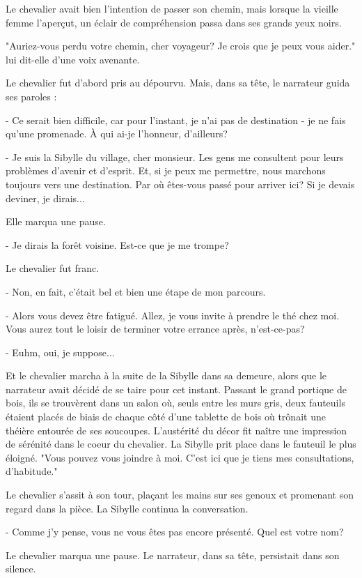 \documentclass[a4paper,11pt, openany]{book}
\begin{document}
Le chevalier avait bien l'intention de passer son chemin, mais lorsque la vieille femme l'aperçut, un éclair de compréhension passa dans ses grands yeux noirs.

"Auriez-vous perdu votre chemin, cher voyageur? Je crois que je peux vous aider." lui dit-elle d'une voix avenante.

Le chevalier fut d'abord pris au dépourvu. Mais, dans sa tête, le narrateur guida ses paroles : 

- Ce serait bien difficile, car pour l'instant, je n'ai pas de destination - je ne fais qu'une promenade. À qui ai-je l'honneur, d'ailleurs?

- Je suis la Sibylle du village, cher monsieur. Les gens me consultent pour leurs problèmes d'avenir et d'esprit. 
Et, si je peux me permettre, nous marchons toujours vers une destination. Par où êtes-vous passé pour arriver ici? Si je devais deviner, je dirais...

Elle marqua une pause.

- Je dirais la forêt voisine. Est-ce que je me trompe?

Le chevalier fut franc.

- Non, en fait, c'était bel et bien une étape de mon parcours.

- Alors vous devez être fatigué. Allez, je vous invite à prendre le thé chez moi. Vous aurez tout le loisir de terminer votre errance après, n'est-ce-pas?

- Euhm, oui, je suppose...

Et le chevalier marcha à la suite de la Sibylle dans sa demeure, alors que le narrateur avait décidé de se taire pour cet instant. 
Passant le grand portique de bois, ils se trouvèrent dans un salon où, seuls entre les murs gris, 
deux fauteuils étaient placés de biais de chaque côté d'une tablette de bois où trônait une théière entourée de ses soucoupes. 
L'austérité du décor fit naître une impression de sérénité dans le coeur du chevalier.
La Sibylle prit place dans le fauteuil le plus éloigné.
"Vous pouvez vous joindre à moi. C'est ici que je tiens mes consultations, d'habitude."

Le chevalier s'assit à son tour, plaçant les mains sur ses genoux et promenant son regard dans la pièce. La Sibylle continua la conversation.

- Comme j'y pense, vous ne vous êtes pas encore présenté. Quel est votre nom?

Le chevalier marqua une pause. Le narrateur, dans sa tête, persistait dans son silence.
\end{document}
